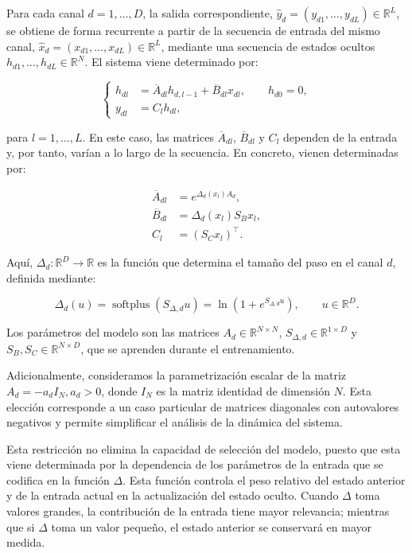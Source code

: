 Para cada canal $d=1,\ldots,D$, la salida correspondiente, $\hat{y}_d=(y_{d1},\ldots,y_{dL})\in\mathbb{R}^L$, 
se obtiene de forma recurrente a partir de la secuencia de entrada del mismo canal, $\hat{x}_d=(x_{d1},\ldots,x_{dL})\in\mathbb{R}^L$, 
mediante una secuencia de estados ocultos $h_{d1},\ldots,h_{dL}\in\mathbb{R}^N$. El sistema viene determinado por:

\begin{equation}
\label{eq:s6-recurrence}
\left\{
\begin{aligned}
h_{dl} &= \overline{A}_{dl}h_{d,l-1} + \overline{B}_{dl}x_{dl}, \qquad h_{d0}=0,\\
y_{dl} &= C_l h_{dl},
\end{aligned}
\right.
\end{equation}

para $l=1,\ldots,L$. En este caso, las matrices $\overline{A}_{dl}$, $\overline{B}_{dl}$ y $C_l$ dependen de 
la entrada y, por tanto, varían a lo largo de la secuencia. En concreto, vienen determinadas por:

\begin{equation}
\label{eq:s6-parameters}
\begin{aligned}
\overline{A}_{dl} &= e^{\Delta_d(x_l)A_d},\\
\overline{B}_{dl} &= \Delta_d(x_l)S_Bx_l,\\
C_l &= (S_Cx_l)^\top.
\end{aligned}
\end{equation}

Aquí, $\Delta_d:\mathbb{R}^D\rightarrow\mathbb{R}$ es la función que determina el tamaño del paso en el canal 
$d$, definida mediante:

\[
\Delta_d(u) = \operatorname{softplus}(S_{\Delta,d}u) = \ln\left(1+e^{S_{\Delta,d}u}\right), \qquad u\in\mathbb{R}^D.
\]

Los parámetros del modelo son las matrices $A_d\in\mathbb{R}^{N\times N}$, $S_{\Delta,d}\in\mathbb{R}^{1\times D}$ 
y $S_B,S_C\in\mathbb{R}^{N\times D}$, que se aprenden durante el entrenamiento.

Adicionalmente, consideramos la parametrización escalar de la matriz $A_d = -a_d I_N, a_d>0$, donde $I_N$ es 
la matriz identidad de dimensión $N$. Esta elección corresponde a un caso particular de matrices diagonales con 
autovalores negativos y permite simplificar el análisis de la dinámica del sistema.

Esta restricción no elimina la capacidad de selección del modelo, puesto que esta viene determinada por la 
dependencia de los parámetros de la entrada que se codifica en la función $\Delta$. Esta función controla el 
peso relativo del estado anterior y de la entrada actual en la actualización del estado oculto. Cuando $\Delta$ 
toma valores grandes, la contribución de la entrada tiene mayor relevancia; mientras que si $\Delta$ toma un 
valor pequeño, el estado anterior se conservará en mayor medida.


